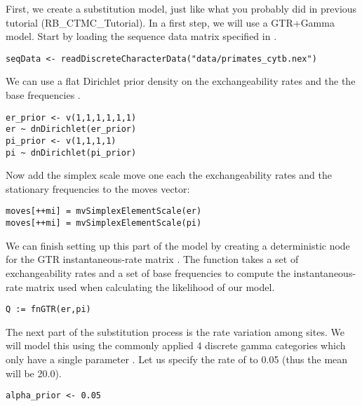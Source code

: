 First, we create a substitution model, just like what you probably did in previous tutorial (\EG RB\_CTMC\_Tutorial). 
In a first step, we will use a GTR+Gamma model.
Start by loading the sequence data matrix specified in .
{\tt \begin{snugshade*}
\begin{lstlisting}
seqData <- readDiscreteCharacterData("data/primates_cytb.nex")
\end{lstlisting}
\end{snugshade*}}
We can use a flat Dirichlet prior density on the exchangeability rates  and the the base frequencies .
{\tt \begin{snugshade*}
\begin{lstlisting}
er_prior <- v(1,1,1,1,1,1) 
er ~ dnDirichlet(er_prior)
pi_prior <- v(1,1,1,1) 
pi ~ dnDirichlet(pi_prior)
\end{lstlisting}
\end{snugshade*}}
Now add the simplex scale move one each the exchangeability rates  and the stationary frequencies  to the moves vector:
{\tt \small \begin{snugshade*}
\begin{lstlisting}
moves[++mi] = mvSimplexElementScale(er) 
moves[++mi] = mvSimplexElementScale(pi)  
\end{lstlisting}
\end{snugshade*}}
We can finish setting up this part of the model by creating a deterministic node for the GTR instantaneous-rate matrix . 
The  function takes a set of exchangeability rates and a set of base frequencies to compute the instantaneous-rate matrix used when calculating the likelihood of our model.
{\tt \begin{snugshade*}
\begin{lstlisting}
Q := fnGTR(er,pi)
\end{lstlisting}
\end{snugshade*}}
The next part of the substitution process is the rate variation among sites. We will model this using the commonly applied 4 discrete gamma categories which only have a single parameter .
Let us specify the rate of  to 0.05 (thus the mean will be 20.0).
{\tt\begin{snugshade*}
\begin{lstlisting}
alpha_prior <- 0.05                                                                             
\end{lstlisting}
\end{snugshade*}}
